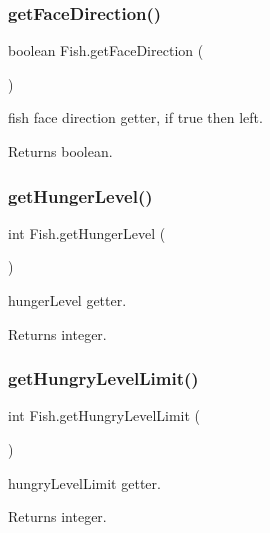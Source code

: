 \subsubsection{\texorpdfstring{get\+Face\+Direction()}{getFaceDirection()}}
{\footnotesize\ttfamily boolean Fish.\+get\+Face\+Direction (\begin{DoxyParamCaption}{ }\end{DoxyParamCaption})\hspace{0.3cm}{\ttfamily [inline]}}

fish face direction getter, if true then left. \begin{DoxyReturn}{Returns}
boolean. 
\end{DoxyReturn}
\mbox{\label{class_fish_a6b0fb4a552039ab06338470584bd838b}} 
\subsubsection{\texorpdfstring{get\+Hunger\+Level()}{getHungerLevel()}}
{\footnotesize\ttfamily int Fish.\+get\+Hunger\+Level (\begin{DoxyParamCaption}{ }\end{DoxyParamCaption})\hspace{0.3cm}{\ttfamily [inline]}}

hunger\+Level getter. \begin{DoxyReturn}{Returns}
integer. 
\end{DoxyReturn}
\mbox{\label{class_fish_aa121fc4335ac49aa48e4ef9e137c0e8b}} 
\subsubsection{\texorpdfstring{get\+Hungry\+Level\+Limit()}{getHungryLevelLimit()}}
{\footnotesize\ttfamily int Fish.\+get\+Hungry\+Level\+Limit (\begin{DoxyParamCaption}{ }\end{DoxyParamCaption})\hspace{0.3cm}{\ttfamily [inline]}}

hungry\+Level\+Limit getter. \begin{DoxyReturn}{Returns}
integer. 
\end{DoxyReturn}
\mbox{\label{class_fish_a8c7a1a1666af0c425a9ef0e83d33779c}} 
